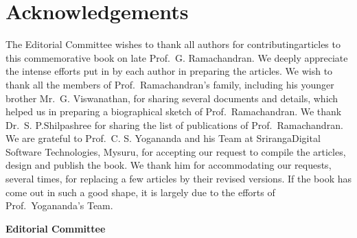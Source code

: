 \chapter*{Acknowledgements}

The Editorial Committee wishes to thank all authors for contributing\break articles to this commemorative book on late Prof.\ G. Ramachandran. We deeply appreciate the intense efforts put in by each author in preparing the articles. We wish to thank all the members of Prof.\ Ramachandran's family, including his younger brother Mr.\ G. Viswanathan, for sharing several documents and details, which helped us in preparing a biographical sketch of Prof.\ Ramachandran. We thank Dr.\ S. P.\break Shilpashree for sharing the list of publications of Prof.\ Ramachandran. We are grateful to Prof.\ C. S. Yogananda and his Team at Sriranga\break Digital Software Technologies, Mysuru, for accepting our request to compile the articles, design and publish the book. We thank him for accommodating our requests, several times, for replacing a few articles by their revised versions. If the book has come out in such a good shape, it is largely due to the efforts of Prof.\ Yogananda's Team.  
\vskip 2cm

\hfill	{\bf Editorial Committee}
